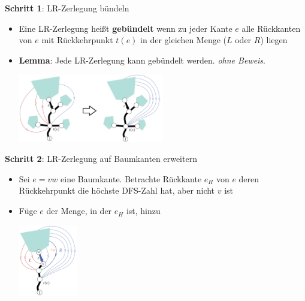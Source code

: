 \textbf{Schritt 1}: LR-Zerlegung bündeln
\begin{itemize}
	\item Eine LR-Zerlegung heißt \textbf{gebündelt} wenn zu jeder Kante $e$ alle Rückkanten von $e$ mit Rückkehrpunkt $t(e)$ in der gleichen Menge ($L$ oder $R$) liegen
	\item \textbf{Lemma}: Jede LR-Zerlegung kann gebündelt werden. \qquad \textit{ohne Beweis}.
	\begin{center}
		\includegraphics[width=0.5\textwidth]{images/lr-3.png}
	\end{center}
\end{itemize}

\textbf{Schritt 2}: LR-Zerlegung auf Baumkanten erweitern
\begin{itemize}
	\item Sei $e = vw$ eine Baumkante. Betrachte Rückkante $e_H$ von $e$ deren Rückkehrpunkt die höchste DFS-Zahl hat, aber nicht $v$ ist
	\item Füge $e$ der Menge, in der $e_H$ ist, hinzu
	\begin{center}
		\includegraphics[width=0.2\textwidth]{images/lr-4.png}
	\end{center}
\end{itemize}

